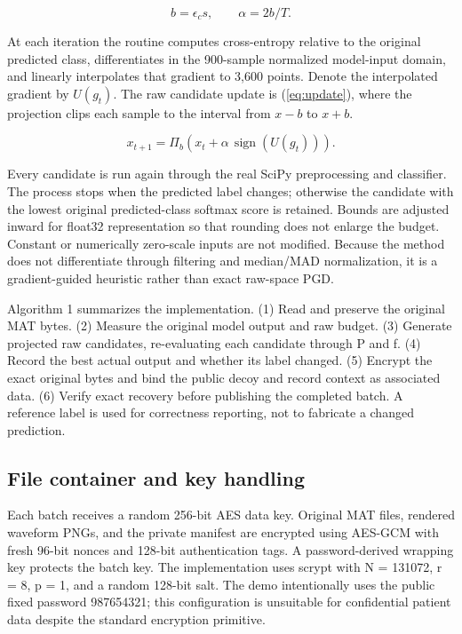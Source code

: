 \documentclass{jpp}
\begin{document}
\begin{equation} b=\epsilon_c s, \qquad \alpha=2b/T. \label{eq:budget} \end{equation}

At each iteration the routine computes cross-entropy relative to the original predicted class, differentiates in the 900-sample normalized model-input domain, and linearly interpolates that gradient to 3,600 points. Denote the interpolated gradient by $U(g_t)$. The raw candidate update is (\ref{eq:update}), where the projection clips each sample to the interval from $x-b$ to $x+b$.

\begin{equation} x_{t+1}=\Pi_b\!\left(x_t+\alpha\,\operatorname{sign}(U(g_t))\right). \label{eq:update} \end{equation}

Every candidate is run again through the real SciPy preprocessing and classifier. The process stops when the predicted label changes; otherwise the candidate with the lowest original predicted-class softmax score is retained. Bounds are adjusted inward for float32 representation so that rounding does not enlarge the budget. Constant or numerically zero-scale inputs are not modified. Because the method does not differentiate through filtering and median/MAD normalization, it is a gradient-guided heuristic rather than exact raw-space PGD.

Algorithm 1 summarizes the implementation. (1) Read and preserve the original MAT bytes. (2) Measure the original model output and raw budget. (3) Generate projected raw candidates, re-evaluating each candidate through P and f. (4) Record the best actual output and whether its label changed. (5) Encrypt the exact original bytes and bind the public decoy and record context as associated data. (6) Verify exact recovery before publishing the completed batch. A reference label is used for correctness reporting, not to fabricate a changed prediction.

\subsection{File container and key handling}

Each batch receives a random 256-bit AES data key. Original MAT files, rendered waveform PNGs, and the private manifest are encrypted using AES-GCM with fresh 96-bit nonces and 128-bit authentication tags. A password-derived wrapping key protects the batch key. The implementation uses scrypt with N = 131072, r = 8, p = 1, and a random 128-bit salt. The demo intentionally uses the public fixed password 987654321; this configuration is unsuitable for confidential patient data despite the standard encryption primitive.
\end{document}
